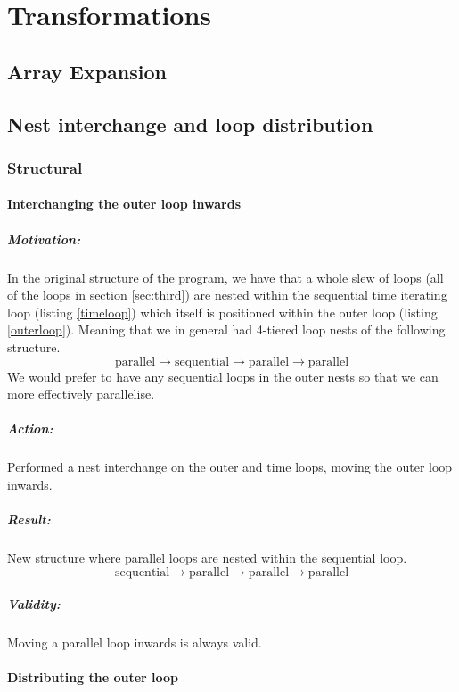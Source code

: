 \section{Transformations}

\subsection{Array Expansion}

\subsection{Nest interchange and loop distribution}

\subsubsection{Structural}
\paragraph{Interchanging the outer loop inwards}
\subparagraph{Motivation:} In the original structure of the program, we have that a whole slew of loops
 (all of the loops in section \ref{sec:third}) are nested
 within the sequential time iterating loop (listing \ref{timeloop}) which itself is positioned within
 the outer loop (listing \ref{outerloop}). Meaning that we in general had 4-tiered loop nests of the following
 structure.
$$\mathrm{parallel} \to \mathrm{sequential} \to \mathrm{parallel} \to \mathrm{parallel}$$
We would prefer to have any sequential loops in the outer nests so that we can more effectively
 parallelise.
\subparagraph{Action:} Performed a nest interchange on the outer and time loops, moving the outer loop inwards.
\subparagraph{Result:} New structure where parallel loops are nested within the sequential loop.
$$\mathrm{sequential} \to \mathrm{parallel} \to \mathrm{parallel} \to \mathrm{parallel}$$
\subparagraph{Validity:} Moving a parallel loop inwards is always valid.

\paragraph{Distributing the outer loop}

